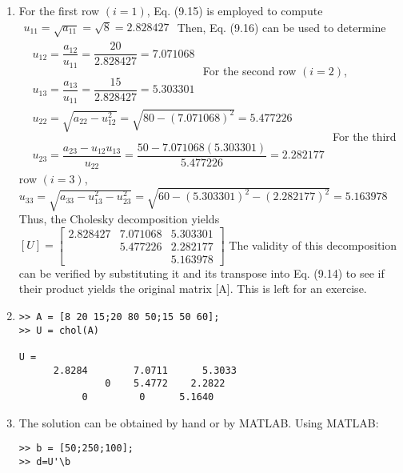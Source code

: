 \documentclass[../main.tex]{subfiles}
\begin{document}
\section{}
\begin{enumerate}[label=\bfseries(\alph*)]
\item For the first row $(i=1)$, Eq. (9.15) is employed to compute
\bigbreak$
\begin{aligned}u_{11}=\sqrt{a_{11}}=\sqrt{8}=2.828427\end{aligned}$
\bigbreak
Then, Eq. (9.16) can be used to determine
\bigbreak$
\begin{aligned}
&u_{12}=\dfrac{a_{12}}{u_{11}}=\dfrac{20}{2.828427}=7.071068 \\\\
&u_{13}=\dfrac{a_{13}}{u_{11}}=\dfrac{15}{2.828427}=5.303301
\end{aligned}$
\bigbreak
For the second row $(i=2)$,
\bigbreak$
\begin{aligned}
&u_{22}=\sqrt{a_{22}-u_{12}^{2}}=\sqrt{80-(7.071068)^{2}}=5.477226 \\\\
&u_{23}=\dfrac{a_{23}-u_{12} u_{13}}{u_{22}}=\dfrac{50-7.071068(5.303301)}{5.477226}=2.282177
\end{aligned}$
\bigbreak
For the third row $(i=3)$,
\bigbreak
$u_{33}=\sqrt{a_{33}-u_{13}^{2}-u_{23}^{2}}=\sqrt{60-(5.303301)^{2}-(2.282177)^{2}}=5.163978$
\bigbreak
Thus, the Cholesky decomposition yields
\bigbreak
$[U]=\left[\begin{array}{lll}
2.828427 & 7.071068 & 5.303301 \\
& 5.477226 & 2.282177 \\
& & 5.163978
\end{array}\right]$
\bigbreak
The validity of this decomposition can be verified by substituting it and its transpose into Eq. (9.14) to see if their product yields the original matrix [A]. This is left for an exercise.
\bigbreak
\item 
\begin{lstlisting}[numbers=none]
>> A = [8 20 15;20 80 50;15 50 60];
>> U = chol(A)

U =
 	  2.8284 		7.0711 		5.3033
 			   0    5.4772    2.2822
 	       0         0 		5.1640 
\end{lstlisting}
\bigbreak
\item The solution can be obtained by hand or by MATLAB. Using MATLAB:
\bigbreak
\begin{lstlisting}[numbers=none]
>> b = [50;250;100];
>> d=U'\b


\end{lstlisting}
\end{enumerate}
\end{document}
